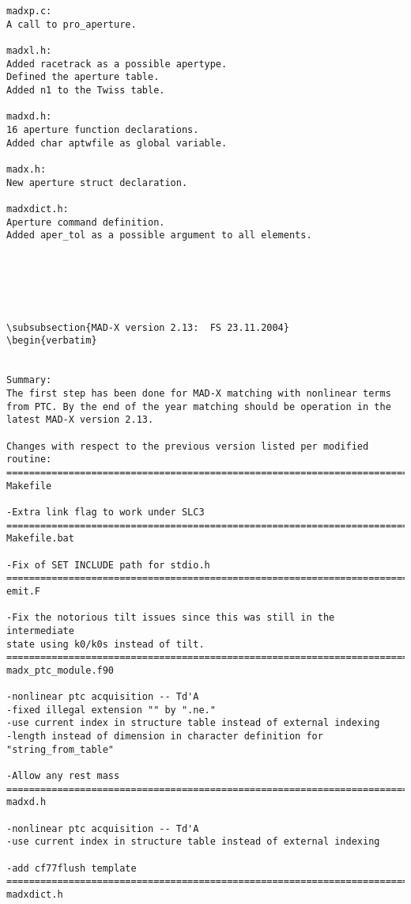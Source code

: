 \begin{verbatim}
madxp.c:
A call to pro_aperture.

madxl.h:
Added racetrack as a possible apertype.
Defined the aperture table.
Added n1 to the Twiss table.

madxd.h:
16 aperture function declarations.
Added char aptwfile as global variable.

madx.h:
New aperture struct declaration.

madxdict.h:
Aperture command definition.
Added aper_tol as a possible argument to all elements.






\subsubsection{MAD-X version 2.13:  FS 23.11.2004}
\begin{verbatim}


Summary:
The first step has been done for MAD-X matching with nonlinear terms
from PTC. By the end of the year matching should be operation in the
latest MAD-X version 2.13.

Changes with respect to the previous version listed per modified routine:
=============================================================================
Makefile

-Extra link flag to work under SLC3
=============================================================================
Makefile.bat

-Fix of SET INCLUDE path for stdio.h
=============================================================================
emit.F

-Fix the notorious tilt issues since this was still in the intermediate
state using k0/k0s instead of tilt.
=============================================================================
madx_ptc_module.f90

-nonlinear ptc acquisition -- Td'A
-fixed illegal extension "" by ".ne."
-use current index in structure table instead of external indexing
-length instead of dimension in character definition for "string_from_table"

-Allow any rest mass
=============================================================================
madxd.h

-nonlinear ptc acquisition -- Td'A
-use current index in structure table instead of external indexing

-add cf77flush template
=============================================================================
madxdict.h


\end{verbatim}
